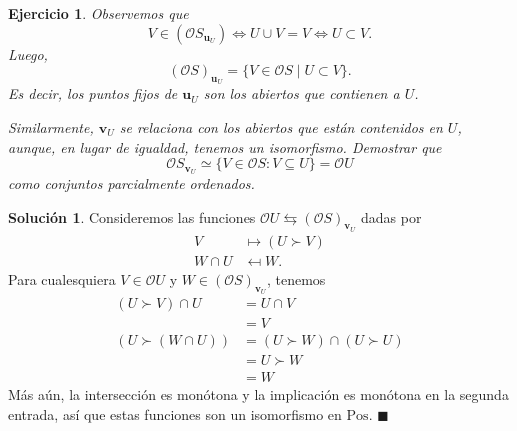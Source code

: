 \documentclass[12pt,letterpaper,titlepage]{article}
\newcommand{\xqed}[1]{%
  \leavevmode\unskip\penalty9999 \hbox{}\nobreak\hfill
  \quad\hbox{\ensuremath{#1}}}
\newtheorem{exe}{Ejercicio}
\theoremstyle{definition}
\newtheorem*{soltemp}{Solución}
\newenvironment{sol}[1]{%
    \begin{soltemp}#1}{%
    \xqed{\blacksquare}\end{soltemp}%
}
\renewcommand\cal[1]{\mathcal{#1}}
\newcommand\unuc[1]{\mathbf u_{#1}}
\newcommand\vnuc[1]{\mathbf v_{#1}}
\newcommand\<{\langle}
\renewcommand\>{\rangle}
\newcommand{\Pos}{\mathrm{Pos}}
\begin{document}
\begin{exe}%
    \label{exe:cociente-abierto-cerrado}
    Observemos que
    \[
        V \in(\cal OS_{\unuc U}) \iff U\cup V=V \iff U\subset V
    .\]
    Luego,
    \[
        (\cal OS)_{\unuc U} = \{V\in \cal OS \mid U\subset V\}
    .\]
    Es decir, los puntos fijos de $\unuc U$ son los abiertos
    que contienen a $U$.
    
    Similarmente, $\vnuc U$ se relaciona con los abiertos
    que están contenidos en $U$, aunque, en lugar de igualdad,
    tenemos un isomorfismo.
    Demostrar que
    \[
        \cal OS_{\vnuc U} \simeq
        \{V\in \cal OS : V\subseteq U\} = \cal OU
    \]
    como conjuntos parcialmente ordenados.
\end{exe}
\begin{sol}
    Consideremos las funciones
    $\cal OU\leftrightarrows(\cal OS)_{\vnuc U}$
    dadas por
    \begin{align*}
         V &\mapsto (U\succ V) \\
         W\cap U &\mapsfrom W.
    \end{align*}
    Para cualesquiera $V\in \cal OU$
    y $W\in (\cal OS)_{\vnuc U}$, tenemos
    \begin{align*}
        (U\succ V)\cap U
        &= U\cap V \\
        &= V \\
        (U\succ (W\cap U))
        &= (U\succ W)\cap(U\succ U) \\
        &= U\succ W \\
        &= W
    \end{align*}
    Más aún, la intersección es monótona
    y la implicación es monótona en la segunda entrada, así que
    estas funciones son un isomorfismo en $\Pos$.
\end{sol}
\end{document}
